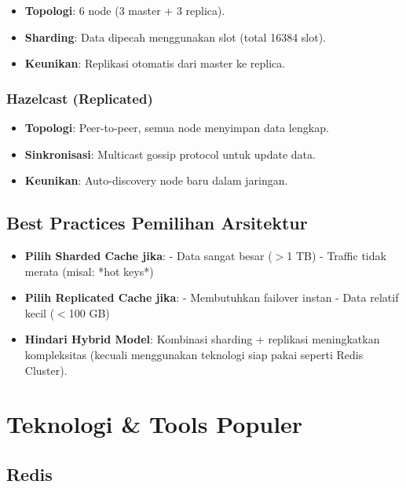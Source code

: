 \documentclass[11pt, a4paper]{book}
\begin{document}
	\begin{itemize}
		\item \textbf{Topologi}:  
		6 node (3 master + 3 replica).
		\item \textbf{Sharding}:  
		Data dipecah menggunakan slot (total 16384 slot).
		\item \textbf{Keunikan}:  
		Replikasi otomatis dari master ke replica.
	\end{itemize}
	
	\subsection{Hazelcast (Replicated)}
	\label{subsec:hazelcast}
	
	\begin{itemize}
		\item \textbf{Topologi}:  
		Peer-to-peer, semua node menyimpan data lengkap.
		\item \textbf{Sinkronisasi}:  
		Multicast gossip protocol untuk update data.
		\item \textbf{Keunikan}:  
		Auto-discovery node baru dalam jaringan.
	\end{itemize}
	
	\section*{Best Practices Pemilihan Arsitektur}
	\label{sec:best-practices-arsitektur}
	
	\begin{itemize}
		\item \textbf{Pilih Sharded Cache jika}:  
		- Data sangat besar ($>$1 TB)  
		- Traffic tidak merata (misal: *hot keys*)
		
		\item \textbf{Pilih Replicated Cache jika}:  
		- Membutuhkan failover instan  
		- Data relatif kecil ($<$100 GB)
		
		\item \textbf{Hindari Hybrid Model}:  
		Kombinasi sharding + replikasi meningkatkan kompleksitas (kecuali menggunakan teknologi siap pakai seperti Redis Cluster).
	\end{itemize}
	
	\chapter{Teknologi \& Tools Populer}
	\label{chap:teknologi-tools}
	
	\section{Redis}
	\label{sec:redis}
	
\end{document}
